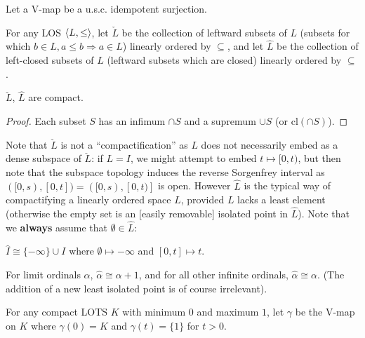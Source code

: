 \documentclass[11pt]{article}
\renewcommand{\cl}{\textrm{cl}}
\begin{document}
  \begin{definition}
    Let a V-map be a u.s.c. idempotent surjection.
  \end{definition}

  \begin{definition}
    For any LOS \(\langle L,\leq\rangle\), let \(\check L\) be the collection of
    leftward subsets of \(L\)
    (subsets for which \(b\in L,a\leq b\Rightarrow a\in L\))
    linearly ordered by \(\subseteq\), and let \(\hat L\) be the collection
    of left-closed subsets of \(L\) (leftward subsets which are closed)
    linearly ordered by \(\subseteq\).
  \end{definition}

  \begin{proposition}
    \(\check L\), \(\hat L\) are compact.
  \end{proposition}

  \begin{proof}
    Each subset \(S\) has an infimum \(\cap S\) and a supremum \(\cup S\)
    (or \(\cl(\cap S)\)).
  \end{proof}

  Note that \(\check L\)
  is not a ``compactification'' as \(L\) does not necessarily
  embed as a dense subspace of \(\check L\): if \(L=I\), we might attempt to embed
  \(t\mapsto [0,t)\), but then note that the subspace topology induces the
  reverse Sorgenfrey interval as \(([0,s),[0,t])=([0,s),[0,t)]\) is open.
  However \(\hat L\) is
  the typical way of compactifying a linearly ordered space \(L\),
  provided \(L\) lacks a least element (otherwise the empty set is an [easily
  removable] isolated point in \(\hat L\)). Note that we \textbf{always}
  assume that \(\emptyset\in\hat L\):

  \begin{example}
    \(\hat I\cong\{-\infty\}\cup I\) where
    \(\emptyset\mapsto-\infty\) and \([0,t]\mapsto t\).
  \end{example}

  \begin{example}
    For limit ordinals \(\alpha\), \(\hat \alpha\cong \alpha+1\),
    and for all other infinite ordinals, \(\hat\alpha\cong\alpha\).
    (The addition of a new least isolated point is of course irrelevant).
  \end{example}

  \begin{definition}
    For any compact LOTS \(K\) with minimum \(0\) and maximum \(1\),
    let \(\gamma\) be the V-map on \(K\) where \(\gamma(0)=K\) and \(\gamma(t)=\{1\}\)
    for \(t>0\).
  \end{definition}
\end{document}
